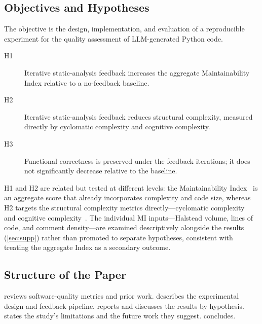 \subsection{Objectives and Hypotheses}
The objective is the design, implementation, and evaluation of a reproducible
experiment for the quality assessment of LLM-generated Python code.
\begin{description}
  \item[H1] Iterative static-analysis feedback increases the aggregate
    Maintainability Index relative to a no-feedback baseline.
  \item[H2] Iterative static-analysis feedback reduces structural complexity,
    measured directly by cyclomatic complexity and cognitive complexity.
  \item[H3] Functional correctness is preserved under the feedback iterations; it
    does not significantly decrease relative to the baseline.
\end{description}

\noindent H1 and H2 are related but tested at different levels: the Maintainability
Index~\citep{coleman1994maintainability} is an aggregate score that already
incorporates complexity and code size, whereas H2 targets the structural
complexity metrics directly---cyclomatic complexity~\citep{mccabe1976complexity}
and cognitive complexity~\citep{cognitivecomplexity}. The individual MI
inputs---Halstead volume, lines of code, and comment density---are examined
descriptively alongside the results (\cref{sec:supp}) rather than promoted to
separate hypotheses, consistent with treating the aggregate Index as a secondary
outcome.

\subsection{Structure of the Paper}
 reviews software-quality metrics and prior work.
 describes the experimental design and feedback pipeline.
 reports and discusses the results by hypothesis.
 states the study's limitations and the future work they
suggest.  concludes.
